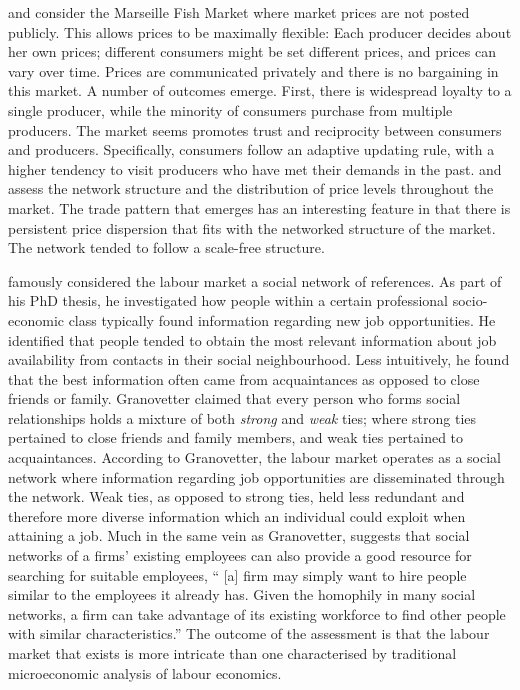 \citet{Weisbuch2000} and \citet{KirmanVriend2001} consider the Marseille Fish Market where market prices are not posted publicly. This allows prices to be maximally flexible: Each producer decides about her own prices; different consumers might be set different prices, and prices can vary over time. Prices are communicated privately and there is no bargaining in this market. A number of outcomes emerge. First, there is widespread loyalty to a single producer, while the minority of consumers purchase from multiple producers. The market seems promotes trust and reciprocity between consumers and producers. Specifically, consumers follow an adaptive updating rule, with a higher tendency to visit producers who have met their demands in the past. \citet{Vignes1993} and \citet{VignesEtienne2011} assess the network structure and the distribution of price levels throughout the market. The trade pattern that emerges has an interesting feature in that there is persistent price dispersion that fits with the networked structure of the market. The network tended to follow a scale-free structure.

\citet{Granovetter1973} famously considered the labour market a social network of references. As part of his PhD thesis, he investigated how people within a certain professional socio-economic class typically found information regarding new job opportunities. He identified that people tended to obtain the most relevant information about job availability from contacts in their social neighbourhood. Less intuitively, he found that the best information often came from acquaintances as opposed to close friends or family. Granovetter claimed that every person who forms social relationships holds a mixture of both \emph{strong} and \emph{weak} ties; where strong ties pertained to close friends and family members, and weak ties pertained to acquaintances. According to Granovetter, the labour market operates as a social network where information regarding job opportunities are disseminated through the network. Weak ties, as opposed to strong ties, held less redundant and therefore more diverse information which an individual could exploit when attaining a job. Much in the same vein as Granovetter, \citet[p.~333]{Jackson2008} suggests that social networks of a firms' existing employees can also provide a good resource for searching for suitable employees, `` [a] firm may simply want to hire people similar to the employees it already has. Given the homophily in many social networks, a firm can take advantage of its existing workforce to find other people with similar characteristics.'' The outcome of the assessment is that the labour market that exists is more intricate than one characterised by traditional microeconomic analysis of labour economics.


